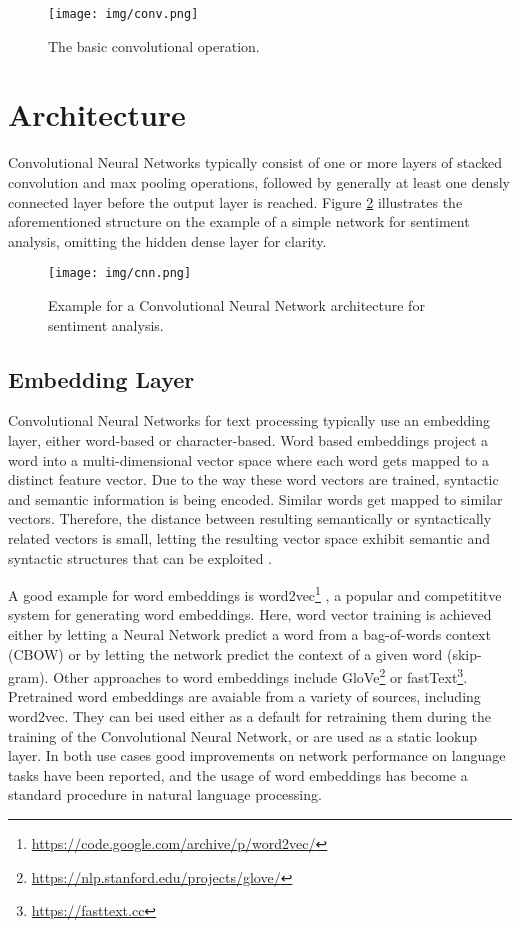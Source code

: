 \documentclass[11pt,a4paper,twoside,openright]{scrbook}
\begin{document}
\begin{figure}[htb]
  \centering
  \texttt{[image: img/conv.png]}
  \caption{The basic convolutional operation. \cite{url:towardsdatascience:basiccnn}}
  \label{fig:basic_conv}
\end{figure}

\section{Architecture}
Convolutional Neural Networks typically consist of one or more layers of stacked convolution and max pooling operations, followed by generally at least one densly connected layer before the output layer is reached. Figure \ref{fig:CNN} illustrates the aforementioned structure on the example of a simple network for sentiment analysis, omitting the hidden dense layer for clarity.

\begin{figure}[h]
  \centering
  \texttt{[image: img/cnn.png]}
  \caption{Example for a Convolutional Neural Network architecture for sentiment analysis. \cite[p.\,466]{Severyn15}}
  \label{fig:CNN}
\end{figure}

\subsection{Embedding Layer}
Convolutional Neural Networks for text processing typically use an embedding layer, either word-based or character-based. Word based embeddings project a word into a multi-dimensional vector space where each word gets mapped to a distinct feature vector. Due to the way these word vectors are trained, syntactic and semantic information is being encoded. Similar words get mapped to similar vectors. Therefore, the distance between resulting semantically or syntactically related vectors is small, letting the resulting vector space exhibit semantic and syntactic structures that can be exploited \cite[p.\,2]{Mikolov13}.

A good example for word embeddings is word2vec\footnote{\url{https://code.google.com/archive/p/word2vec/}} \cite{Mikolov13}, a popular and competititve system for generating word embeddings. Here, word vector training is achieved either by letting a Neural Network predict a word from a bag-of-words context (CBOW) or by letting the network predict the context of a given word (skip-gram). Other approaches to word embeddings include GloVe\footnote{\url{https://nlp.stanford.edu/projects/glove/}} or fastText\footnote{\url{https://fasttext.cc}}.
Pretrained word embeddings are avaiable from a variety of sources, including word2vec. They can bei used either as a default for retraining them during the training of the Convolutional Neural Network, or are used as a static lookup layer. In both use cases good improvements on network performance on language tasks have been reported, and the usage of word embeddings has become a standard procedure in natural language processing.
\end{document}
